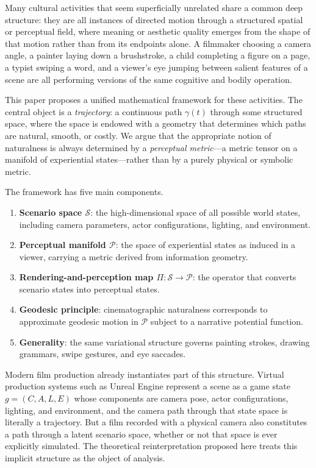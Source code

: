 \documentclass[12pt,a4paper]{article}
\theoremstyle{plain}
\theoremstyle{definition}
\begin{document}
Many cultural activities that seem superficially unrelated share a common deep
structure: they are all instances of directed motion through a structured spatial
or perceptual field, where meaning or aesthetic quality emerges from the shape
of that motion rather than from its endpoints alone. A filmmaker choosing a
camera angle, a painter laying down a brushstroke, a child completing a figure on
a page, a typist swiping a word, and a viewer's eye jumping between salient
features of a scene are all performing versions of the same cognitive and bodily
operation.

This paper proposes a unified mathematical framework for these activities. The
central object is a \emph{trajectory}: a continuous path $\gamma(t)$ through some
structured space, where the space is endowed with a geometry that determines
which paths are natural, smooth, or costly. We argue that the appropriate notion
of naturalness is always determined by a \emph{perceptual metric}---a metric
tensor on a manifold of experiential states---rather than by a purely physical or
symbolic metric.

The framework has five main components.

\begin{enumerate}[label=(\arabic*)]
\item \textbf{Scenario space $\mathcal{S}$}: the high-dimensional space of all
possible world states, including camera parameters, actor configurations,
lighting, and environment.

\item \textbf{Perceptual manifold $\mathcal{P}$}: the space of experiential
states as induced in a viewer, carrying a metric derived from information
geometry.

\item \textbf{Rendering-and-perception map $\Pi:\mathcal{S}\to\mathcal{P}$}:
the operator that converts scenario states into perceptual states.

\item \textbf{Geodesic principle}: cinematographic naturalness corresponds to
approximate geodesic motion in $\mathcal{P}$ subject to a narrative potential
function.

\item \textbf{Generality}: the same variational structure governs painting
strokes, drawing grammars, swipe gestures, and eye saccades.
\end{enumerate}

Modern film production already instantiates part of this structure. Virtual
production systems such as Unreal Engine represent a scene as a game state
$g = (C, A, L, E)$ whose components are camera pose, actor configurations,
lighting, and environment, and the camera path through that state space is
literally a trajectory. But a film recorded with a physical camera also
constitutes a path through a latent scenario space, whether or not that space is
ever explicitly simulated. The theoretical reinterpretation proposed here treats
this implicit structure as the object of analysis.
\end{document}
